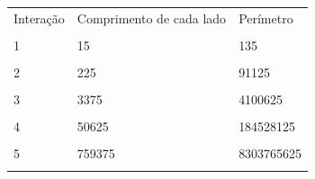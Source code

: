 \documentclass[a4paper, 12pt]{article}
\begin{document}
\begin{enumerate}
\begin{enumerate}
\begin{itemize}
      \begin{tabular}{|m{3cm} | m{5cm} | m{4cm}|}
      \hline
      Interação & Comprimento de cada lado & Perímetro \\ \\
      \hline
      1 & 15 & 135 \\ \\
      \hline
      2 & 225 & 91125 \\ \\
      \hline
      3 & 3375 & 4100625 \\ \\
      \hline
      4 & 50625 & 184528125 \\ \\
      \hline
      5 & 759375 & 8303765625  \\ \\
      \hline
      \end{tabular}
      \end{itemize}      
      \end{enumerate}
\end{enumerate}
\end{document}
